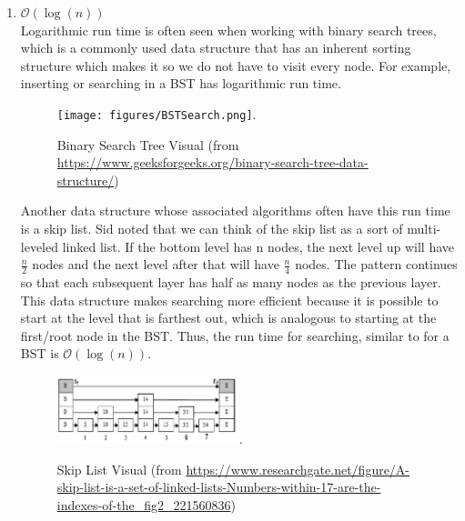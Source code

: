 \begin{enumerate}
    
    \item $\mathcal{O}(\log(n))$ \\
    Logarithmic run time is often seen when working with binary search trees, which is a commonly used data structure that has an inherent sorting structure which makes it so we do not have to visit every node. For example, inserting or searching in a BST has logarithmic run time. \\
    
    \begin{figure}[h!]
  \begin{center}
    \texttt{[image: figures/BSTSearch.png]}.
    \caption{
      Binary Search Tree Visual (from \url{https://www.geeksforgeeks.org/binary-search-tree-data-structure/})}
    \label{fig:example_figure}
  \end{center}
\end{figure}
    
    Another data structure whose associated algorithms often have this run time is a skip list. Sid noted that we can think of the skip list as a sort of multi-leveled linked list. If the bottom level has n nodes, the next level up will have $\frac{n}{2}$ nodes and the next level after that will have $\frac{n}{4}$ nodes. The pattern continues so that each subsequent layer has half as many nodes as the previous layer. This data structure makes searching more efficient because it is possible to start at the level that is farthest out, which is analogous to starting at the first/root node in the BST. Thus, the run time for searching, similar to for a BST is $\mathcal{O}(\log(n))$. \\
    
    \begin{figure}[h!]
  \begin{center}
    \includegraphics[width=0.5\textwidth]{figures/A-skip-list-is-a-set-of-linked-lists-Numbers-within-17-are-the-indexes-of-the.png}.
    \caption{
      Skip List Visual (from \url{https://www.researchgate.net/figure/A-skip-list-is-a-set-of-linked-lists-Numbers-within-17-are-the-indexes-of-the_fig2_221560836})}
    \label{fig:example_figure}
  \end{center}
\end{figure}


\end{enumerate}
